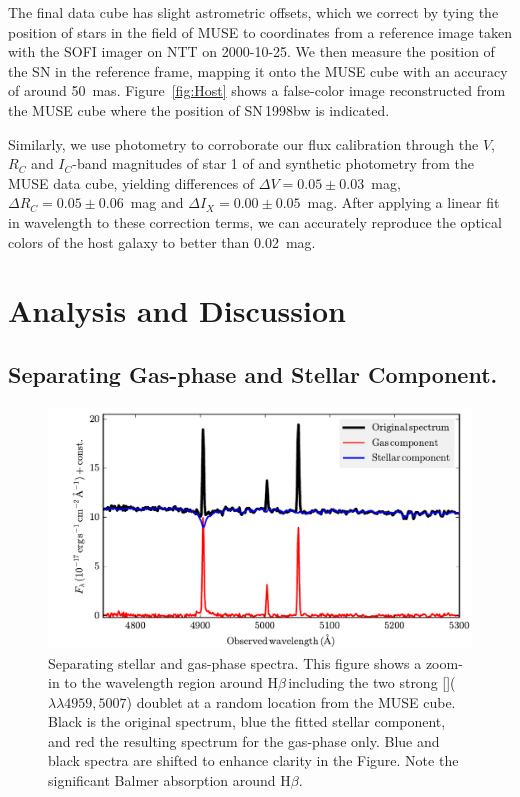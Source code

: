 \documentclass[traditabstract]{aa}
\newcommand{\hb}{H$\beta$}
\newcommand{\oiii}{[\ion{O}{iii}]}
\begin{document}
The final data cube has slight astrometric offsets, which we correct by tying the position of stars in the field of MUSE to coordinates from a reference image taken with the SOFI imager on NTT on 2000-10-25. We then measure the position of the SN in the reference frame, mapping it onto the MUSE cube with an accuracy of around 50~mas. Figure~\ref{fig:Host} shows a false-color image reconstructed from the MUSE cube where the position of SN\,1998bw is indicated.

Similarly, we use photometry to corroborate our flux calibration through the $V$, $R_C$ and $I_C$-band magnitudes of star 1 of \citet{2011AJ....141..163C} and synthetic photometry from the MUSE data cube, yielding differences of $\Delta V = 0.05\pm0.03$~mag, $\Delta R_C = 0.05\pm0.06$~mag and $\Delta I_X = 0.00\pm0.05$~mag. After applying a linear fit in wavelength to these correction terms, we can accurately reproduce the optical colors of the host galaxy \citep{2005NewA...11..103S} to better than 0.02~mag.

\section{Analysis and Discussion}

\subsection{Separating Gas-phase and Stellar Component.}
\label{sec:stargas}

\begin{figure}
\includegraphics[angle=0, width=0.99\columnwidth]{Figs/Stargas_spec.pdf}
\caption{Separating stellar and gas-phase spectra. This figure shows a zoom-in to the wavelength region around \hb\,including the two strong \oiii($\lambda\lambda4959,5007$) doublet at a random location from the MUSE cube. Black is the original spectrum, blue the fitted stellar component, and red the resulting spectrum for the gas-phase only. Blue and black spectra are shifted to enhance clarity in the Figure. Note the significant Balmer absorption around \hb.}
\label{fig:stargas}
\end{figure}
\end{document}
